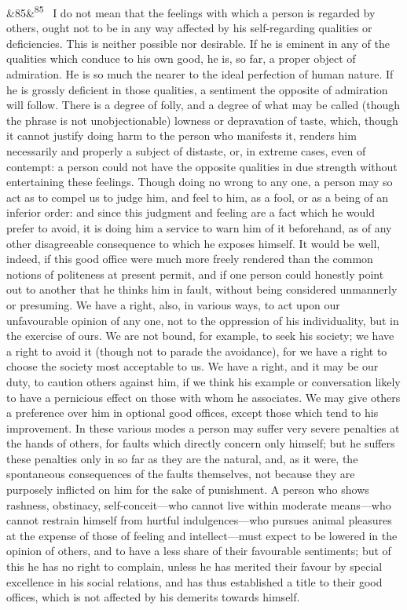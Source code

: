 \documentclass[12pt]{article}
\newcommand{\para}[1][]{\par\noindent\ifx&#1&\else\textsuperscript{\footnotesize #1}~\fi}
\begin{document}
\para[85] I do not mean that the feelings with which a person is regarded by others, ought not to be in any way affected by his self-regarding qualities or deficiencies. This is neither possible nor desirable. If he is eminent in any of the qualities which conduce to his own good, he is, so far, a proper object of admiration. He is so much the nearer to the ideal perfection of human nature. If he is grossly deficient in those qualities, a sentiment the opposite of admiration will follow. There is a degree of folly, and a degree of what may be called (though the phrase is not unobjectionable) lowness or depravation of taste, which, though it cannot justify doing harm to the person who manifests it, renders him necessarily and properly a subject of distaste, or, in extreme cases, even of contempt: a person could not have the opposite qualities in due strength without entertaining these feelings. Though doing no wrong to any one, a person may so act as to compel us to judge him, and feel to him, as a fool, or as a being of an inferior order: and since this judgment and feeling are a fact which he would prefer to avoid, it is doing him a service to warn him of it beforehand, as of any other disagreeable consequence to which he exposes himself. It would be well, indeed, if this good office were much more freely rendered than the common notions of politeness at present permit, and if one person could honestly point out to another that he thinks him in fault, without being considered unmannerly or presuming. We have a right, also, in various ways, to act upon our unfavourable opinion of any one, not to the oppression of his individuality, but in the exercise of ours. We are not bound, for example, to seek his society; we have a right to avoid it (though not to parade the avoidance), for we have a right to choose the society most acceptable to us. We have a right, and it may be our duty, to caution others against him, if we think his example or conversation likely to have a pernicious effect on those with whom he associates. We may give others a preference over him in optional good offices, except those which tend to his improvement. In these various modes a person may suffer very severe penalties at the hands of others, for faults which directly concern only himself; but he suffers these penalties only in so far as they are the natural, and, as it were, the spontaneous consequences of the faults themselves, not because they are purposely inflicted on him for the sake of punishment. A person who shows rashness, obstinacy, self-conceit---who cannot live within moderate means---who cannot restrain himself from hurtful indulgences---who pursues animal pleasures at the expense of those of feeling and intellect---must expect to be lowered in the opinion of others, and to have a less share of their favourable sentiments; but of this he has no right to complain, unless he has merited their favour by special excellence in his social relations, and has thus established a title to their good offices, which is not affected by his demerits towards himself.
\end{document}
